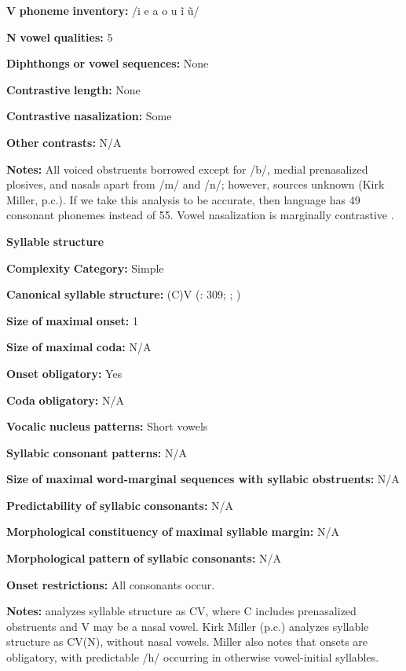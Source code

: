 \textbf{V} \textbf{phoneme} \textbf{inventory:} /i e a o u ĩ ũ/

\textbf{N} \textbf{vowel} \textbf{qualities:} 5

\textbf{Diphthongs} \textbf{or} \textbf{vowel} \textbf{sequences:} None

\textbf{Contrastive} \textbf{length:} None

\textbf{Contrastive} \textbf{nasalization:} Some

\textbf{Other} \textbf{contrasts:} N/A

\textbf{Notes:} All voiced obstruents borrowed except for /b/, medial prenasalized plosives, and nasals apart from /m/ and /n/; however, sources unknown (Kirk Miller, p.c.). If we take this analysis to be accurate, then language has 49 consonant phonemes instead of 55. Vowel nasalization is marginally contrastive \citep[38]{Sands2013}.

\textbf{Syllable} \textbf{structure}

\textbf{Complexity} \textbf{Category:} Simple

\textbf{Canonical} \textbf{syllable} \textbf{structure:} (C)V (\citealt{TuckerEtAl1977}: 309; \citealt{SandsEtAl1996}; \citealt{Sands2013})

\textbf{Size} \textbf{of} \textbf{maximal} \textbf{onset:} 1

\textbf{Size} \textbf{of} \textbf{maximal} \textbf{coda:} N/A

\textbf{Onset} \textbf{obligatory:} Yes

\textbf{Coda} \textbf{obligatory:} N/A

\textbf{Vocalic} \textbf{nucleus} \textbf{patterns:} Short vowels

\textbf{Syllabic} \textbf{consonant} \textbf{patterns:} N/A

\textbf{Size} \textbf{of} \textbf{maximal} \textbf{word{}-marginal sequences with syllabic obstruents:} N/A

\textbf{Predictability} \textbf{of} \textbf{syllabic} \textbf{consonants:} N/A

\textbf{Morphological} \textbf{constituency} \textbf{of} \textbf{maximal} \textbf{syllable} \textbf{margin:} N/A

\textbf{Morphological} \textbf{pattern} \textbf{of} \textbf{syllabic} \textbf{consonants:} N/A

\textbf{Onset} \textbf{restrictions:} All consonants occur.

\textbf{Notes:} \citet{Sands2013} analyzes syllable structure as CV, where C includes prenasalized obstruents and V may be a nasal vowel. Kirk Miller (p.c.) analyzes syllable structure as CV(N), without nasal vowels. Miller also notes that onsets are obligatory, with predictable /h/ occurring in otherwise vowel-initial syllables.

